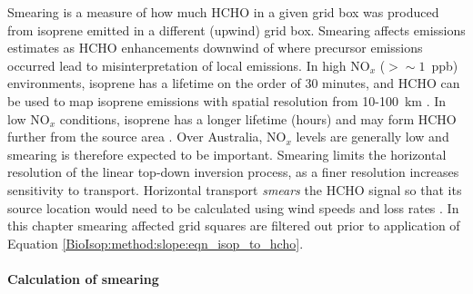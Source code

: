 \documentclass[acp, manuscript]{copernicus}
\newcommand{\parencite}{\citep}
\newcommand{\textcite}{\citet}
\newcommand{\lowhr}{$2^{\circ} \times 2.5^{\circ}$}
\begin{document}
    Smearing is a measure of how much HCHO in a given grid box was produced from isoprene emitted in a different (upwind) grid box.
    Smearing affects emissions estimates as HCHO enhancements downwind of where precursor emissions occurred lead to misinterpretation of local emissions.
    In high NO$_x$ ($ > \sim 1 $~ppb) environments, isoprene has a lifetime on the order of 30 minutes, and HCHO can be used to map isoprene emissions with spatial resolution from 10-100~km \parencite{Palmer2003}.
    In low NO$_x$ conditions, isoprene has a longer lifetime (hours) and may form HCHO further from the source area \parencite{Fan2004,Liu2016a,Liu2017_hpald}.
    Over Australia, NO$_x$ levels are generally low and smearing is therefore expected to be important.
    Smearing limits the horizontal resolution of the linear top-down inversion process, as a finer resolution increases sensitivity to transport.
    Horizontal transport \textit{smears} the HCHO signal so that its source location would need to be calculated using wind speeds and loss rates \parencite{Palmer2001,Palmer2003}.
    In this chapter smearing affected grid squares are filtered out prior to application of Equation \ref{BioIsop:method:slope:eqn_isop_to_hcho}.
    
    
    \paragraph{Calculation of smearing}
    \label{Model:filter:smearing:calculation}
    
\end{document}
